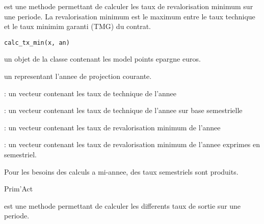 \documentclass[a4paper]{book}
\begin{document}
%
\begin{Description}\relax
{} est une methode permettant de calculer les taux de revalorisation minimum
sur une periode. La revalorisation minimum est le maximum entre le taux technique et
le taux minimim garanti (TMG) du contrat.
\end{Description}
%
\begin{Usage}
\begin{verbatim}
calc_tx_min(x, an)
\end{verbatim}
\end{Usage}
%
\begin{Arguments}
\begin{ldescription}
\item[\code{x}] un objet de la classe  contenant les model points epargne euros.

\item[\code{an}] un  representant l'annee de projection courante.
\end{ldescription}
\end{Arguments}
%
\begin{Value}
 : un vecteur contenant les taux de technique de l'annee

 : un vecteur contenant les taux de technique de l'annee sur base semestrielle

 : un vecteur contenant les taux de revalorisation minimum de l'annee

 : un vecteur contenant les taux de revalorisation minimum de l'annee exprimes en semestriel.
\end{Value}
%
\begin{Note}\relax
Pour les besoins des calculs a mi-annee, des taux semestriels sont produits.
\end{Note}
%
\begin{Author}\relax
Prim'Act
\end{Author}
%
\begin{Description}\relax
{} est une methode permettant de calculer les differents taux de sortie
sur une periode.
\end{Description}
\end{document}
